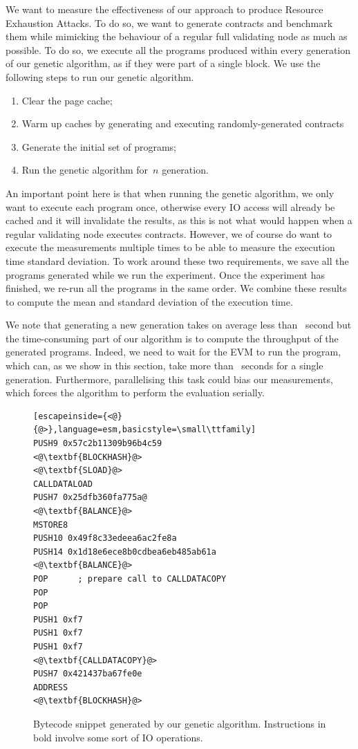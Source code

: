   We want to measure the effectiveness of our approach to produce Resource Exhaustion Attacks. To do so, we want to generate contracts and benchmark them while mimicking the behaviour of a regular full validating node as much as possible. To do so, we execute all the programs produced within every generation of our genetic algorithm, as if they were part of a single block. We use the following steps to run our genetic algorithm.

  \begin{enumerate}
    \item Clear the page cache;
    \item Warm up caches by generating and executing randomly-generated contracts
    \item Generate the initial set of programs;
    \item Run the genetic algorithm for~$n$ generation.
  \end{enumerate}
  An important point here is that when running the genetic algorithm, we only want to execute each program once, otherwise every IO access will already be cached and it will invalidate the results, as this is not what would happen when a regular validating node executes contracts. However, we of course do want to execute the measurements multiple times to be able to measure the execution time standard deviation. To work around these two requirements, we save all the programs generated while we run the experiment.
  Once the experiment has finished, we re-run all the programs in the same order. We combine these results to compute the mean and standard deviation of the execution time.

  We note that generating a new generation takes on average less than~ second but the time-consuming part of our algorithm is to compute the throughput of the generated programs. Indeed, we need to wait for the EVM to run the program, which can, as we show in this section, take more than~ seconds for a single generation. Furthermore, parallelising this task could bias our measurements, which forces the algorithm to perform the evaluation serially.

  \begin{figure}
    \begin{lstlisting}[escapeinside={<@}{@>},language=esm,basicstyle=\small\ttfamily]
PUSH9 0x57c2b11309b96b4c59
<@\textbf{BLOCKHASH}@>
<@\textbf{SLOAD}@>
CALLDATALOAD
PUSH7 0x25dfb360fa775a@
<@\textbf{BALANCE}@>
MSTORE8
PUSH10 0x49f8c33edeea6ac2fe8a
PUSH14 0x1d18e6ece8b0cdbea6eb485ab61a
<@\textbf{BALANCE}@>
POP      ; prepare call to CALLDATACOPY
POP
POP
PUSH1 0xf7
PUSH1 0xf7
PUSH1 0xf7
<@\textbf{CALLDATACOPY}@>
PUSH7 0x421437ba67fe0e
ADDRESS
<@\textbf{BLOCKHASH}@>
\end{lstlisting}
    \caption{Bytecode snippet generated by our genetic algorithm. Instructions in bold involve some sort of IO operations.}
    \label{list:generated-code}
  \end{figure}

